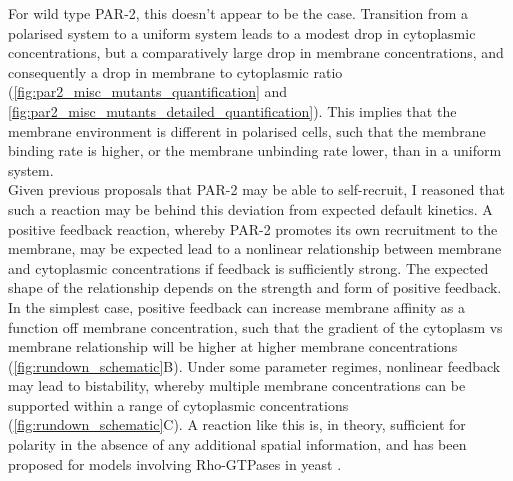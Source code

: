 \documentclass[12pt]{"report"}
\begin{document}
For wild type PAR-2, this doesn't appear to be the case. Transition from a polarised system to a uniform system leads to a modest drop in cytoplasmic concentrations, but a comparatively large drop in membrane concentrations, and consequently a drop in membrane to cytoplasmic ratio (\cref{fig:par2_misc_mutants_quantification} and \ref{fig:par2_misc_mutants_detailed_quantification}). This implies that the membrane environment is different in polarised cells, such that the membrane binding rate is higher, or the membrane unbinding rate lower, than in a uniform system.\\

Given previous proposals that PAR-2 may be able to self-recruit, I reasoned that such a reaction may be behind this deviation from expected default kinetics. A positive feedback reaction, whereby PAR-2 promotes its own recruitment to the membrane, may be expected lead to a nonlinear relationship between membrane and cytoplasmic concentrations if feedback is sufficiently strong. The expected shape of the relationship depends on the strength and form of positive feedback. In the simplest case, positive feedback can increase membrane affinity as a function off membrane concentration, such that the gradient of the cytoplasm vs membrane relationship will be higher at higher membrane concentrations (\cref{fig:rundown_schematic}B). Under some parameter regimes, nonlinear feedback may lead to bistability, whereby multiple membrane concentrations can be supported within a range of cytoplasmic concentrations (\cref{fig:rundown_schematic}C). A reaction like this is, in theory, sufficient for polarity in the absence of any additional spatial information, and has been proposed for models involving Rho-GTPases in yeast \citep{Mori2008}.\\
\end{document}
